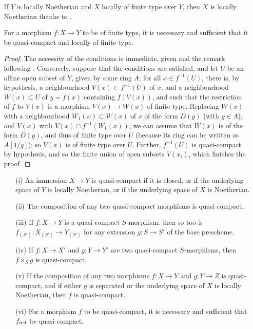 If $Y$ is locally Noetherian and $X$ locally of finite type over $Y$, then $X$ is locally Noetherian thanks to .

\begin{proposition}[6.6.3]
\label{I.6.6.3}
For a morphism $f: X\to Y$ to be of finite type, it is necessary and sufficient that it be quasi-compact and locally of finite type.
\end{proposition}

\begin{proof}
\label{proof-1.6.6.3}
The necessity of the conditions is immediate, given  and the remark following .
Conversely, suppose that the conditions are satisfied, and let $U$ be an affine open subset of $Y$, given by some ring $A$;
for all $x\in f^{-1}(U)$, there is, by hypothesis, a neighbourhood $V(x)\subset f^{-1}(U)$ of $x$, and a neighbourhood $W(x)\subset U$ of $y=f(x)$ containing $f(V(x))$, and such that the restriction of $f$ to $V(x)$ is a morphism $V(x)\to W(x)$ of finite type.
Replacing $W(x)$ with a neighbourhood $W_1(x)\subset W(x)$ of $x$ of the form $D(g)$ (with $g\in A$), and $V(x)$ with $V(x)\cap f^{-1}(W_1(x))$, we can assume that $W(x)$ is of the form $D(g)$, and thus of finite type over $U$ (because its ring can be written as $A[1/g]$);
so $V(x)$ is of finite type over $U$.
Further, $f^{-1}(U)$ is quasi-compact by hypothesis, and so the finite union of open subsets $V(x_i)$, which finishes the proof.
\end{proof}

\begin{proposition}[6.6.4]
\label{I.6.6.4}
\medskip\noindent
\begin{enumerate}
  \item[{\rm(i)}] An immersion $X\to Y$ is quasi-compact if it is closed, or if the underlying space of $Y$ is locally Noetherian, or if the underlying space of $X$ is Noetherian.
  \item[{\rm(ii)}] The composition of any two quasi-compact morphisms is quasi-compact.
  \item[{\rm(iii)}] If $f: X\to Y$ is a quasi-compact $S$-morphism, then so too is $f_{(S')}: X_{(S')}\to Y_{(S')}$ for any extension $g: S\to S'$ of the base prescheme.
  \item[{\rm(iv)}] If $f:X\to X'$ and $g:Y\to Y'$ are two quasi-compact $S$-morphisms, then $f\times_S g$ is quasi-compact.
  \item[{\rm(v)}] If the composition of any two morphisms $f: X\to Y$ and $g:Y\to Z$ is quasi-compact, and if either $g$ is separated or the underlying space of $X$ is locally Noetherian, then $f$ is quasi-compact.
  \item[{\rm(vi)}] For a morphism $f$ to be quasi-compact, it is necessary and sufficient that $f_{\mathrm{red}}$ be quasi-compact.
\end{enumerate}
\end{proposition}

